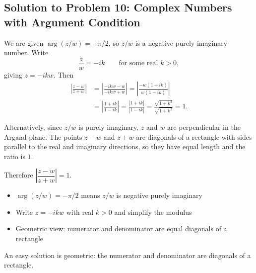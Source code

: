 \subsection{Solution to Problem 10: Complex Numbers with Argument Condition}

\begin{solution}
We are given $\arg(z/w) = -\pi/2$, so $z/w$ is a negative purely imaginary number. Write
\[
\frac{z}{w} = -ik \qquad \text{for some real } k > 0,
\]
giving $z = -ikw$. Then
\begin{align*}
\left|\frac{z-w}{z+w}\right|
&= \left|\frac{-ikw - w}{-ikw + w}\right|
= \left|\frac{-w(1+ik)}{w(1-ik)}\right| \\
&= \left|\frac{1+ik}{1-ik}\right|
= \frac{|1+ik|}{|1-ik|}
= \frac{\sqrt{1+k^2}}{\sqrt{1+k^2}}
= 1.
\end{align*}

Alternatively, since $z/w$ is purely imaginary, $z$ and $w$ are perpendicular in the Argand plane. The points $z-w$ and $z+w$ are diagonals of a rectangle with sides parallel to the real and imaginary directions, so they have equal length and the ratio is $1$.

Therefore $\left|\dfrac{z-w}{z+w}\right| = 1$.
\end{solution}

\begin{takeaways}
\begin{itemize}
    \item $\arg(z/w) = -\pi/2$ means $z/w$ is negative purely imaginary
    \item Write $z = -ikw$ with real $k > 0$ and simplify the modulus
    \item Geometric view: numerator and denominator are equal diagonals of a rectangle
\end{itemize}
\end{takeaways}

\begin{remark}
An easy solution is geometric: the numerator and denominator are diagonals of a rectangle.
\end{remark}
